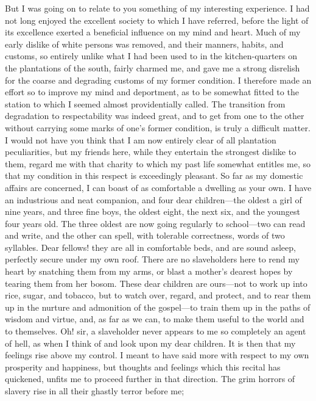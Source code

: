 But I was going on to relate to you something of my interesting
experience. I had not long enjoyed the excellent society to which I have
referred, before the light of its excellence exerted a beneficial
influence on my mind and heart. Much of my early dislike of white
persons was removed, and their manners, habits, and customs, so entirely
unlike what I had been used to in the kitchen-quarters on the
plantations of the south, fairly charmed me, and gave me a strong
disrelish for the coarse and degrading customs of my former condition. I
therefore made an effort so to improve my mind and deportment, as to be
somewhat fitted to the station to which I seemed almost providentially
called. The transition from degradation to respectability was indeed
great, and to get from one to the other without carrying some marks of
one's former condition, is truly a difficult matter. I would not have
you think that I am now entirely clear of all plantation peculiarities,
but my friends here, while they entertain the strongest dislike to them,
regard me with that charity to which my past life somewhat entitles me,
so that my condition in this respect is exceedingly pleasant. So far
{\protect\hypertarget{426}{}{}}as my domestic affairs are concerned, I
can boast of as comfortable a dwelling as your own. I have an
industrious and neat companion, and four dear children---the oldest a
girl of nine years, and three fine boys, the oldest eight, the next six,
and the youngest four years old. The three oldest are now going
regularly to school---two can read and write, and the other can spell,
with tolerable correctness, words of two syllables. Dear fellows! they
are all in comfortable beds, and are sound asleep, perfectly secure
under my own roof. There are no slaveholders here to rend my heart by
snatching them from my arms, or blast a mother's dearest hopes by
tearing them from her bosom. These dear children are ours---not to work
up into rice, sugar, and tobacco, but to watch over, regard, and
protect, and to rear them up in the nurture and admonition of the
gospel---to train them up in the paths of wisdom and virtue, and, as far
as we can, to make them useful to the world and to themselves. Oh! sir,
a slaveholder never appears to me so completely an agent of hell, as
when I think of and look upon my dear children. It is then that my
feelings rise above my control. I meant to have said more with respect
to my own prosperity and happiness, but thoughts and feelings which this
recital has quickened, unfits me to proceed further in that direction.
The grim horrors of slavery rise in all their ghastly terror before me;
